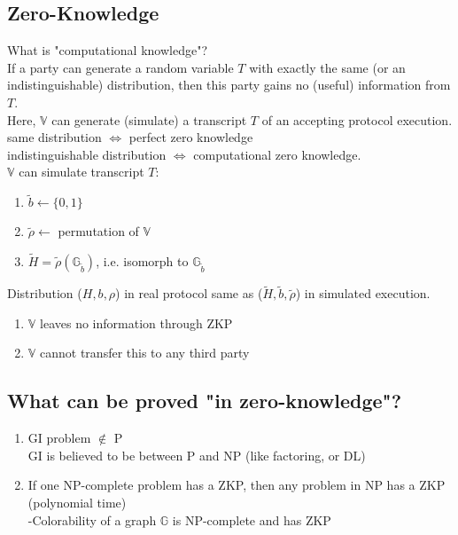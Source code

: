 \documentclass{report}
\begin{document}
		\subsection{Zero-Knowledge}
		\subsectionstart
			What is "computational knowledge"? \\
			If a party can generate a random variable $T$ with exactly the same (or an indistinguishable) distribution, then this party gains no (useful) information from $T$. \\
			Here, $\mathbb{V}$ can generate (simulate) a transcript $T$ of an accepting protocol execution. \\
			same distribution $\Leftrightarrow$ perfect zero knowledge \\
			indistinguishable distribution $\Leftrightarrow$ computational zero knowledge. \\
			$\mathbb{V}$ can simulate transcript $T$:
			\begin{enumerate}
				\item $\tilde{b} \leftarrow \{ 0,1 \}$
				\item $\tilde{\rho} \leftarrow$ permutation of $\mathbb{V}$
				\item $\tilde{H} = \tilde{\rho} (\mathbb{G}_{\tilde{b}})$, i.e. isomorph to $\mathbb{G}_{\tilde{b}}$
			\end{enumerate}
			Distribution ($H, b, \rho$) in real protocol same as ($\tilde{H}, \tilde{b}, \tilde{\rho}$) in simulated execution.
			\begin{enumerate}[$\Rightarrow$]
				\item $\mathbb{V}$ leaves no information through ZKP
				\item $\mathbb{V} $ cannot transfer this to any third party
			\end{enumerate}
		\sectionend
		\subsection{What can be proved "in zero-knowledge"?}
		\subsectionstart
			\begin{enumerate}[-]
				\item GI problem $\not\in$ P \\
				\indent GI is believed to be between P and NP (like factoring, or DL)
				\item If one NP-complete problem has a ZKP, then any problem in NP has a ZKP (polynomial time) \\
				-Colorability of a graph $\mathbb{G}$ is NP-complete and has ZKP
			\end{enumerate}
		\sectionend
\end{document}
